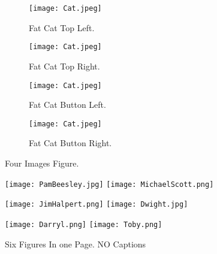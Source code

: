 \documentclass[12pt, oneside]{article}   	%
\begin{document}
\newpage
\begin{figure}[H]
\begin{subfigure}{.5\textwidth}
  \centering
  \texttt{[image: Cat.jpeg]}  
  \caption{Fat Cat Top Left.}
  \label{fig:dataaugA}
\end{subfigure}
\begin{subfigure}{.5\textwidth}
  \centering
  \texttt{[image: Cat.jpeg]}  
  \caption{Fat Cat Top Right.}
  \label{fig:dataaugB}
\end{subfigure}

\begin{subfigure}{.5\textwidth}
  \centering
  \texttt{[image: Cat.jpeg]}  
  \caption{Fat Cat Button Left.}
  \label{fig:dataaugC}
\end{subfigure}
\begin{subfigure}{.5\textwidth}
  \centering
  \texttt{[image: Cat.jpeg]}  
  \caption{Fat Cat Button Right.}
  \label{fig:dataaugD}
\end{subfigure}
\caption{Four Images Figure.}
\label{fig:dataaug}
\end{figure}



\newpage
\begin{figure}[p]
  \centering
  \texttt{[image: PamBeesley.jpg]}
  \hspace{1cm}
  \texttt{[image: MichaelScott.png]}

  \vspace{1.5cm}

  \texttt{[image: JimHalpert.png]}
  \hspace{1cm}
  \texttt{[image: Dwight.jpg]}

  \vspace{1.5cm}

  \texttt{[image: Darryl.png]}
  \hspace{1cm}
  \texttt{[image: Toby.png]}

  \caption{Six Figures In one Page. NO Captions}
\end{figure}
\end{document}

